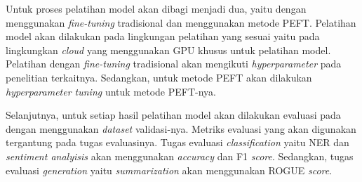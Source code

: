 Untuk proses pelatihan model akan dibagi menjadi dua, yaitu dengan menggunakan \textit{fine-tuning} tradisional dan menggunakan metode PEFT. Pelatihan model akan dilakukan pada lingkungan pelatihan yang sesuai yaitu pada lingkungkan \textit{cloud} yang menggunakan GPU khusus untuk pelatihan model. Pelatihan dengan \textit{fine-tuning} tradisional akan mengikuti \textit{hyperparameter} pada penelitian terkaitnya. Sedangkan, untuk metode PEFT akan dilakukan \textit{hyperparameter tuning} untuk metode PEFT-nya.

Selanjutnya, untuk setiap hasil pelatihan model akan dilakukan evaluasi pada dengan menggunakan \textit{dataset} validasi-nya. Metriks evaluasi yang akan digunakan tergantung pada tugas evaluasinya. Tugas evaluasi \textit{classification} yaitu NER dan \textit{sentiment analyisis} akan menggunakan \textit{accuracy} dan F1 \textit{score}. Sedangkan, tugas evaluasi \textit{generation} yaitu \textit{summarization} akan menggunakan ROGUE \textit{score}.

